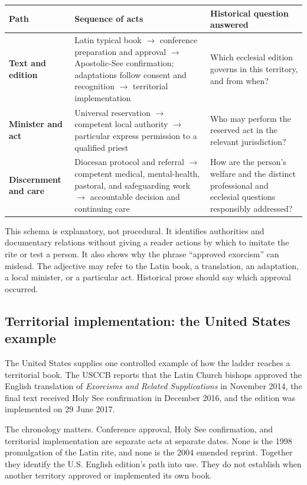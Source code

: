 \begin{center}
\small
\begin{tabularx}{\textwidth}{>{\bfseries}p{}
  >{\RaggedRight\arraybackslash}X
  >{\RaggedRight\arraybackslash}X}
\toprule
Path & Sequence of acts & Historical question answered\\
\midrule
Text and edition &
Latin typical book $\rightarrow$ conference preparation and approval
$\rightarrow$ Apostolic-See confirmation; adaptations follow consent and
recognition $\rightarrow$ territorial implementation &
Which ecclesial edition governs in this territory, and from when?\\
Minister and act &
Universal reservation $\rightarrow$ competent local authority
$\rightarrow$ particular express permission to a qualified priest &
Who may perform the reserved act in the relevant jurisdiction?\\
Discernment and care &
Diocesan protocol and referral $\rightarrow$ competent medical,
mental-health, pastoral, and safeguarding work $\rightarrow$ accountable
decision and continuing care &
How are the person's welfare and the distinct professional and ecclesial
questions responsibly addressed?\\
\bottomrule
\end{tabularx}
\end{center}

This schema is explanatory, not procedural. It identifies authorities and
documentary relations without giving a reader actions by which to imitate the
rite or test a person. It also shows why the phrase ``approved exorcism'' can
mislead. The adjective may refer to the Latin book, a translation, an
adaptation, a local minister, or a particular act. Historical prose should
say which approval occurred.

\subsection{Territorial implementation: the United States example}

The United States supplies one controlled example of how the ladder reaches a
territorial book. The USCCB reports that the Latin Church bishops approved the
English translation of \emph{Exorcisms and Related Supplications} in November
2014, the final text received Holy See confirmation in December 2016, and the
edition was implemented on 29 June 2017.

The chronology matters. Conference approval, Holy See confirmation, and
territorial implementation are separate acts at separate dates. None is the
1998 promulgation of the Latin rite, and none is the 2004 emended reprint.
Together they identify the U.S. English edition's path into use. They do not
establish when another territory approved or implemented its own book.

